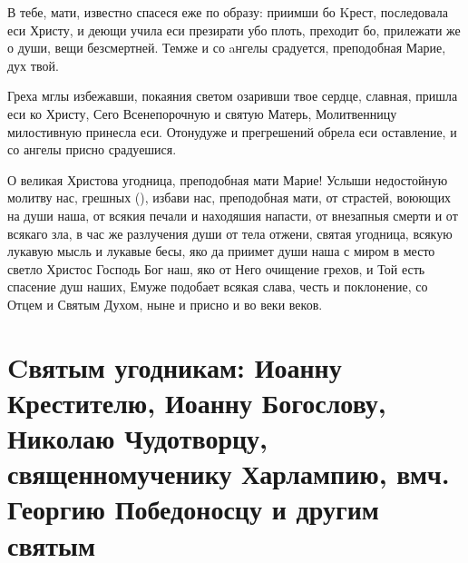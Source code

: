 \tolkopoblagosloveniyu

\begin{mymulticols}


В тебе, мати, известно спасеся еже по образу: приимши бо Kрест, последовала еси Христу, и деющи учила еси презирати убо плоть, преходит бо, прилежати же о души, вещи безсмертней. Темже и со aнгелы срадуется, преподобная Марие, дух твой.




Греха мглы избежавши, покаяния светом озаривши твое сердце, славная, пришла еси ко Христу, Сего Всенепорочную и святую Матерь, Молитвенницу милостивную принесла еси. Отонудуже и прегрешений обрела еси оставление, и со ангелы присно срадуешися.




О великая Христова угодница, преподобная мати Марие! Услыши недостойную молитву нас, грешных (), избави нас, преподобная мати, от страстей, воюющих на души наша, от всякия печали и находяшия напасти, от внезапныя смерти и от всякаго зла, в час же разлучения души от тела отжени, святая угодница, всякую лукавую мысль и лукавые бесы, яко да приимет души наша с миром в место светло Христос Господь Бог наш, яко от Него очищение грехов, и Той есть спасение душ наших, Емуже подобает всякая слава, честь и поклонение, со Отцем и Святым Духом, ныне и присно и во веки веков.






\end{mymulticols}

\section{Cвятым угодникам: Иоанну Крестителю, Иоанну Богослову, Николаю Чудотворцу, священномученику Харлампию, вмч. Георгию Победоносцу и другим святым}

\tolkopoblagosloveniyu

